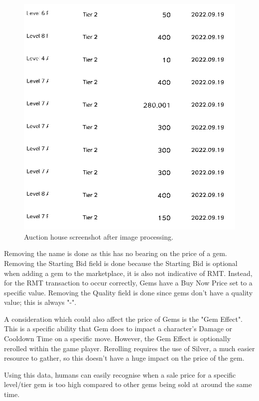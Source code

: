 \documentclass[journal]{IEEEtran}
\begin{document}
\begin{figure}[ht]
    \centering
    \includegraphics[scale=0.25]{auction-house-after}
    \caption{Auction house screenshot after image processing.}
    \label{figure:auction-house-after}
\end{figure}

Removing the name is done as this has no bearing on the price of a gem. Removing the Starting Bid field is done because the Starting Bid is optional when adding a gem to the marketplace, it is also not indicative of RMT. Instead, for the RMT transaction to occur correctly, Gems have a Buy Now Price set to a specific value. Removing the Quality field is done since gems don't have a quality value; this is always "-".

A consideration which could also affect the price of Gems is the "Gem Effect". This is a specific ability that Gem does to impact a character's Damage or Cooldown Time on a specific move. However, the Gem Effect is optionally rerolled within the game player. Rerolling requires the use of Silver, a much easier resource to gather, so this doesn't have a huge impact on the price of the gem.

Using this data, humans can easily recognise when a sale price for a specific level/tier gem is too high compared to other gems being sold at around the same time.
\end{document}
